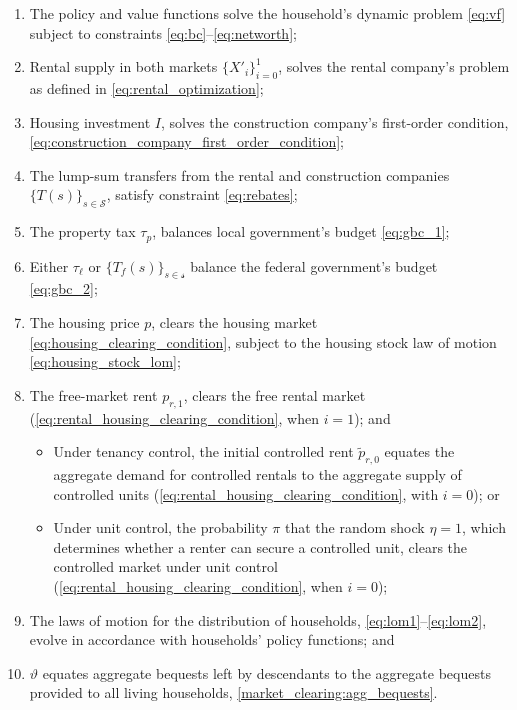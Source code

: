 \documentclass[parskip=full]{article}
\begin{document}
\begin{enumerate}
\item The policy and value functions solve the household's dynamic problem \eqref{eq:vf} subject to constraints \eqref{eq:bc}--\eqref{eq:networth};
\item Rental supply in both markets $\{X'_{i}\}^{1}_{i=0}$, solves the rental company's problem as defined in \eqref{eq:rental_optimization};
\item Housing investment $I$, solves the construction company's first-order condition, \eqref{eq:construction_company_first_order_condition};
\item The lump-sum transfers from the rental and construction companies $\{T(s)\}_{s \in \mathcal{S}}$, satisfy constraint \eqref{eq:rebates};
\item The property tax $\tau_p$, balances local government's budget \eqref{eq:gbc_1};
\item Either $\tau_{\ell}$ or $\{T_{f}(s)\}_{s\in \mathcal{s}}$ balance the federal government's budget \eqref{eq:gbc_2};
\item The housing price $p$, clears the housing market
\eqref{eq:housing_clearing_condition}, subject to the housing stock law of motion \eqref{eq:housing_stock_lom};
\item The free-market rent $p_{r,1}$, clears the free rental market (\eqref{eq:rental_housing_clearing_condition}, when $i=1$); and
\begin{itemize}
    \item Under tenancy control, the initial controlled rent $\tilde{p}_{r,0}$ equates the aggregate demand for controlled rentals to the aggregate supply of controlled units (\eqref{eq:rental_housing_clearing_condition}, with $i=0$); or
    \item Under unit control, the probability $\pi$ that the random shock $\eta=1$, which determines whether a renter can secure a controlled unit, clears the controlled market under unit control (\eqref{eq:rental_housing_clearing_condition}, when $i=0$);
\end{itemize}
\item The laws of motion for the distribution of households, \eqref{eq:lom1}--\eqref{eq:lom2}, evolve in accordance with households' policy functions; and
\item $\vartheta$ equates aggregate bequests left by descendants to the aggregate bequests provided to all living households, \eqref{market_clearing:agg_bequests}.
\end{enumerate}
\end{document}

